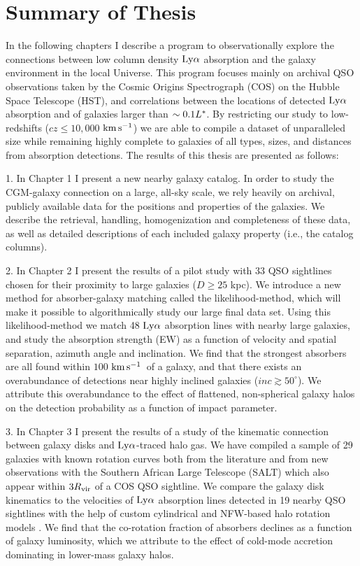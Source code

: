 \documentclass[twocolumn,tighten]{aastex62}
\newcommand{\kms}{$\rm km\, s^{-1}$}
\begin{document}
\section{Summary of Thesis}
In the following chapters I describe a program to observationally explore the connections between low column density $\rm Ly\alpha$ absorption and the galaxy environment in the local Universe. This program focuses mainly on archival QSO observations taken by the Cosmic Origins Spectrograph (COS) on the Hubble Space Telescope (HST), and correlations between the locations of detected $\rm Ly\alpha$ absorption and of galaxies larger than $\sim 0.1 L^{\**}$. By restricting our study to low-redshifts ($cz \leq 10,000$ \kms) we are able to compile a dataset of unparalleled size while remaining highly complete to galaxies of all types, sizes, and distances from absorption detections. The results of this thesis are presented as follows:

1. In Chapter 1 I present a new nearby galaxy catalog. In order to study the CGM-galaxy connection on a large, all-sky scale, we rely heavily on archival, publicly available data for the positions and properties of the galaxies. We describe the retrieval, handling, homogenization and completeness of these data, as well as detailed descriptions of each included galaxy property (i.e., the catalog columns).

 
2. In Chapter 2 I present the results of a pilot study with 33 QSO sightlines chosen for their proximity to large galaxies ($D \ge 25$ kpc). We introduce a new method for absorber-galaxy matching called the likelihood-method, which will make it possible to algorithmically study our large final data set. Using this likelihood-method we match 48 $\rm Ly\alpha$ absorption lines with nearby large galaxies, and study the absorption strength (EW) as a function of velocity and spatial separation, azimuth angle and inclination. We find that the strongest absorbers are all found within $100$ \kms~of a galaxy, and that there exists an overabundance of detections near highly inclined galaxies ($inc \gtrsim 50^{\circ}$). We attribute this overabundance to the effect of flattened, non-spherical galaxy halos on the detection probability as a function of impact parameter.


3. In Chapter 3 I present the results of a study of the kinematic connection between galaxy disks and $\rm Ly\alpha$-traced halo gas. We have compiled a sample of 29 galaxies with known rotation curves both from the literature and from new observations with the Southern African Large Telescope (SALT) which also appear within $3 R_{\rm vir}$ of a COS QSO sightline. We compare the galaxy disk kinematics to the velocities of $\rm Ly\alpha$ absorption lines detected in 19 nearby QSO sightlines with the help of custom cylindrical and NFW-based halo rotation models \citep{navarro1996, navarro1997}. We find that the co-rotation fraction of absorbers declines as a function of galaxy luminosity, which we attribute to the effect of cold-mode accretion dominating in lower-mass galaxy halos.
\end{document}
